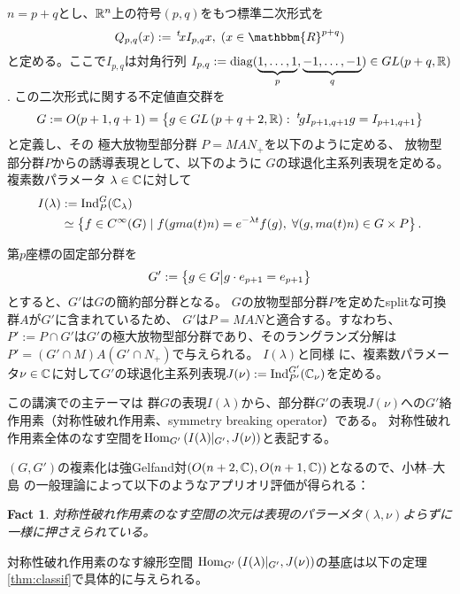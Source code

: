\documentclass[12pt]{article} %
\newcommand{\assign}{:=}
\newcommand{\tmop}[1]{\ensuremath{\operatorname{#1}}}
\newcommand{\Hom}{\mbox{\normalfont Hom}}
\newcommand{\Ind}{\mbox{\normalfont Ind}}
\newtheorem{fact}[theorem]{Fact}
\theoremstyle{definition}
\theoremstyle{exampstyle} \newtheorem{examp}[theorem]{Theorem}
\renewcommand{\Q}{Q_{p,q}}
\newcommand{\IlambdaGprime}{I(\lambda)\kern-0.3em\mid_{G'}}
\newcommand{\SBO}{\Hom_{G'}\left(\IlambdaGprime,J(\nu) \right)}
\newcommand{\doubt}[1]{\uwave{#1}}
\begin{document}
  \begin{versiona}
	  $n=p+q$と{し}、$\mathbb{R}^n$上の符号$(p,q)$をもつ標準二次形式を
	  \begin{equation*}
  \Q (x) \assign \,^t \! x I_{p, q} x, \; (x \in
  \mathbbm{R}^{p + q})
	  \end{equation*}
	  と定める。ここで$I_{p,q}$は対角行列
   $I_{p, q} \assign \tmop{diag} (\underbrace{1, \ldots, 1}_p, \underbrace{-
  1, \ldots, - 1}_q)\in GL(p+q,\R)$.
この二次形式に{関する}不定値直交群を
\begin{equation*}
	G \assign O (p +
1, q + 1)=\left\{ g\in GL\left( p+q+2,\R \right):\;^t\!gI_{p+1,q+1}g=I_{p+1,q+1} \right\}
\end{equation*}
と定義し、その
極大放物型部分群
$P=MAN_{+}$を以下のように定める、
放物型部分群$P$からの誘導表現として、以下のように
$G$の球退化主系列表現を定める。
複素数パラメータ
$\lambda\in\mathbb{C}$に対して
\begin{align*}
I(\lambda)&:=\Ind_P^G(\C_\lambda)\\
&\simeq \left\{ f\in C^{\infty}(G)\mid f(gma(t)n)=e^{-\lambda t}f(g),\;\forall(g,ma(t)n)\in G\times P \right\}.
\end{align*}

第$p$座標の固定部分群を
\begin{equation*}
	G':=\left\{g \in G\big| g \cdot e_{p + 1} = e_{p + 1}\right\}
\end{equation*}
とすると、$G'$は$G$の簡約部分群となる。
$G$の放物型部分群$P$を定めたsplitな可換群$A$が$G'$に含まれているため、
$G'$は$P=MAN$と適合する。すなわち、$P':=P\cap G'$は$G'$の極大放物型部分群であり、そのラングランズ分解は
$P'=(G'\cap M)A(G'\cap N_+)$で与えられ{る}。
$I(\lambda)$と同様
に、複素数パラメータ$\nu\in\mathbb{C}$に対して$G'$の球退化主系列表現$J(\nu):=\Ind_{P'}^{G'}(\C_{\nu})$を定める。

この講演での主テーマは\doubt{、}
群$G$の表現$I(\lambda)$から、部分群$G'$の表現$J(\nu)$への$G'$絡作用素（対称性破れ作用素、symmetry breaking operator）である。
対称性破れ作用素全体のなす空間を$\SBO$と表記す{る}。

$(G,G')$の複素化は強Gelfand対$(O(n+2,\mathbb{C}),O(n+1,\mathbb{C}))$となるので、小林--大島
\cite{kobayashi2013finite}の一般理論によって以下のようなアプリオリ評価が得られる：
\begin{fact}
	対称性破れ作用素のなす空間の次元は表現のパラーメタ$(\lambda,\nu)$よらずに一様に押さえられている。
\end{fact}
対称性破れ作用素のなす線形空間
$\SBO$の基底は以下の定理\ref{thm:classif}で具体的に与えられる。


\end{versiona}
\end{document}
